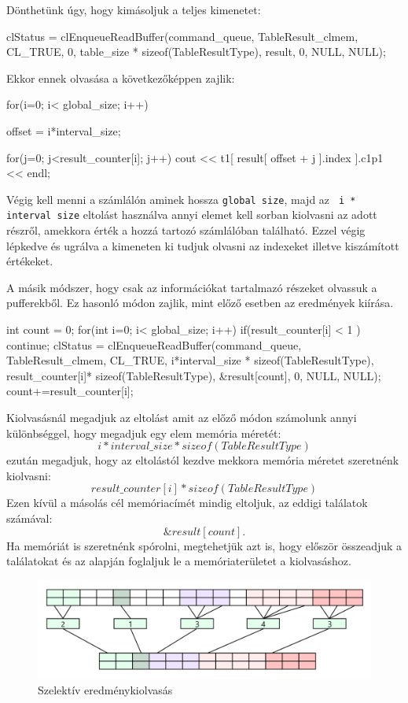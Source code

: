Dönthetünk úgy, hogy kimásoljuk a teljes kimenetet:
\begin{python}
clStatus = clEnqueueReadBuffer(command_queue, TableResult_clmem, 
	CL_TRUE, 0, table_size * sizeof(TableResultType), result, 
	0, NULL, NULL);
\end{python}
Ekkor ennek olvasása a következőképpen zajlik:
\begin{python}
for(i=0; i< global_size; i++)
{
  offset = i*interval_size;
  
  for(j=0; j<result_counter[i]; j++)
  	cout << t1[ result[ offset + j ].index ].c1p1 << endl;
}
\end{python}
Végig kell menni a számlálón aminek hossza \texttt{global size}, majd az \texttt{ i * interval size} eltolást használva annyi elemet kell sorban kiolvasni az adott részről, amekkora érték a hozzá tartozó számlálóban található. Ezzel végig lépkedve és ugrálva a kimeneten ki tudjuk olvasni az indexeket illetve kiszámított értékeket.

A másik módszer, hogy csak az információkat tartalmazó részeket olvassuk a pufferekből. Ez hasonló módon zajlik, mint előző esetben az eredmények kiírása.

\begin{python}
int count = 0;
for(int i=0; i< global_size; i++)
{
if(result_counter[i] < 1 ) continue; 
clStatus = clEnqueueReadBuffer(command_queue, TableResult_clmem, CL_TRUE, 
	i*interval_size * sizeof(TableResultType),
	result_counter[i]* sizeof(TableResultType), 
	&result[count], 0, NULL, NULL);
	count+=result_counter[i];
}
\end{python}

Kiolvasásnál megadjuk az eltolást amit az előző módon számolunk annyi különbséggel, hogy megadjuk egy elem memória méretét:
$$i * interval\_size * sizeof(TableResultType)$$ezután megadjuk, hogy az eltolástól kezdve mekkora memória méretet szeretnénk kiolvasni: $$result\_counter[i] * sizeof(TableResultType)$$Ezen kívül a másolás cél memóriacímét mindig eltoljuk, az eddigi találatok számával: $$\&result[count].$$
Ha memóriát is szeretnénk spórolni, megtehetjük azt is, hogy először összeadjuk a találatokat és az alapján foglaljuk le a memóriaterületet a kiolvasáshoz.
\begin{figure}[h!]
\centering
\includegraphics[width=\textwidth]{images/copy_02.png}
\caption{Szelektív eredménykiolvasás}
\label{fig:opencl}
\end{figure}
\newpage
{}


